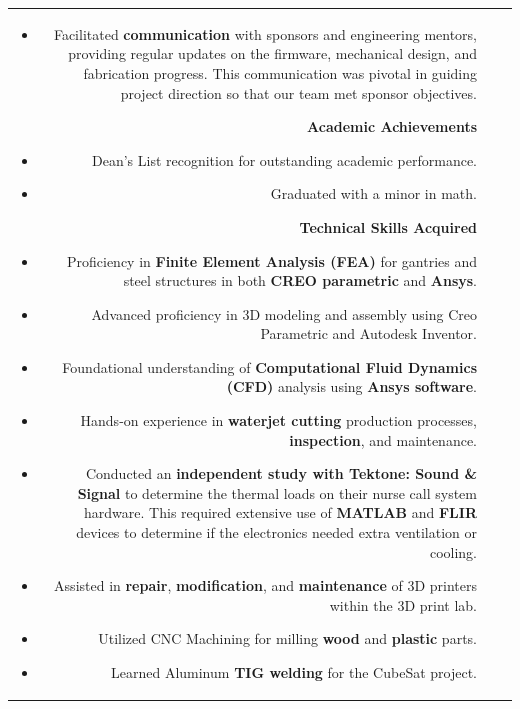 \documentclass[allblack]{simplehipstercv}
\begin{document}
\begin{paracol}{2}
\begin{tabular}{r| p{} c}
{\begin{itemize}
                \item Facilitated \textbf{communication} with sponsors and engineering mentors, providing regular updates on the firmware, mechanical design, and fabrication progress. 
                This communication was pivotal in guiding project direction so that our team met sponsor objectives.
            \end{itemize}
            \textbf{Academic Achievements}
            \begin{itemize}
                \item Dean's List recognition for outstanding academic performance.
                \item Graduated with a minor in math.
            \end{itemize}
            \textbf{Technical Skills Acquired}
            \begin{itemize}
                \item Proficiency in \textbf{Finite Element Analysis (FEA)} for gantries and steel structures in both \textbf{CREO parametric} and \textbf{Ansys}.
                \item Advanced proficiency in 3D modeling and assembly using Creo Parametric and Autodesk Inventor.
                \item Foundational understanding of \textbf{Computational Fluid Dynamics (CFD)} analysis using \textbf{Ansys software}.
                \item Hands-on experience in \textbf{waterjet cutting} production processes, \textbf{inspection}, and maintenance.
                \item Conducted an \textbf{independent study with Tektone: Sound \& Signal} to determine the thermal loads on their nurse call system hardware. 
                This required extensive use of \textbf{MATLAB} and \textbf{FLIR} devices to determine if the electronics needed extra ventilation or cooling.
                \item Assisted in \textbf{repair}, \textbf{modification}, and \textbf{maintenance} of 3D printers within the 3D print lab.
                \item Utilized CNC Machining for milling \textbf{wood} and \textbf{plastic} parts.
                \item Learned Aluminum \textbf{TIG welding} for the CubeSat project. 
            \end{itemize}
        } \\

\end{tabular}
\end{paracol}
\end{document}

